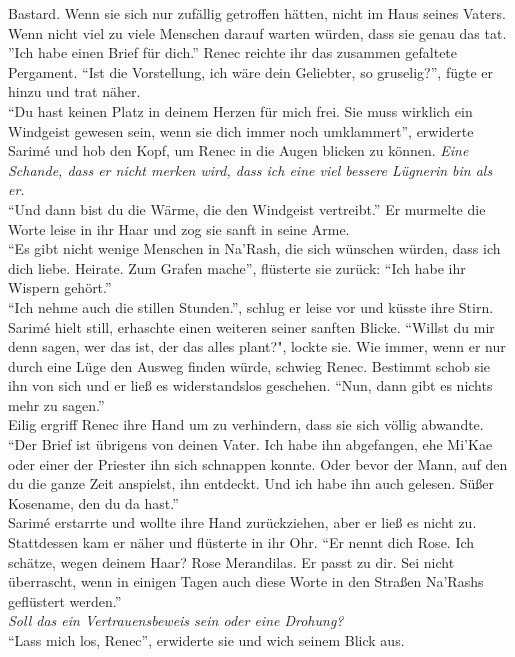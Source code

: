 Bastard. Wenn sie sich nur zufällig getroffen hätten, nicht im Haus seines Vaters. Wenn nicht viel 
zu viele Menschen darauf warten würden, dass sie genau das tat.\\
''Ich habe einen Brief für dich.'' Renec reichte ihr das zusammen gefaltete Pergament. ``Ist die 
Vorstellung, ich wäre dein Geliebter, so gruselig?'', fügte er hinzu und trat näher.\\
``Du hast keinen Platz in deinem Herzen für mich frei. Sie muss wirklich ein Windgeist gewesen 
sein, wenn sie dich immer noch umklammert'', erwiderte Sarimé und hob den Kopf, um Renec in die 
Augen blicken zu können. \textit{Eine Schande, dass er nicht merken wird, dass ich eine viel 
bessere Lügnerin bin als er.}\\
``Und dann bist du die Wärme, die den Windgeist vertreibt.'' Er murmelte die Worte leise in ihr 
Haar und zog sie sanft in seine Arme.\\
``Es gibt nicht wenige Menschen in Na'Rash, die sich wünschen würden, dass ich dich liebe. Heirate. 
Zum Grafen mache'', flüsterte sie zurück: ``Ich habe ihr Wispern gehört.''\\
``Ich nehme auch die stillen Stunden.'', schlug er leise vor und küsste ihre Stirn.\\
Sarimé hielt still, erhaschte einen weiteren seiner sanften Blicke. ``Willst du mir denn sagen, 
wer das ist, der das alles plant?", lockte sie.
Wie immer, wenn er nur durch eine Lüge den Ausweg finden würde, schwieg Renec. Bestimmt schob sie 
ihn von sich und er ließ es widerstandslos geschehen. ``Nun, dann gibt es nichts mehr zu sagen.''\\
Eilig ergriff Renec ihre Hand um zu verhindern, dass sie sich völlig abwandte. ``Der Brief ist 
übrigens von deinen Vater. Ich habe ihn abgefangen, ehe Mi'Kae oder einer der Priester ihn sich 
schnappen konnte. Oder bevor der Mann, auf den du die ganze Zeit anspielst, ihn entdeckt. Und ich 
habe ihn auch gelesen. Süßer Kosename, den du da hast.''\\
Sarimé erstarrte und wollte ihre Hand zurückziehen, aber er ließ es nicht zu. Stattdessen kam er 
näher und flüsterte in ihr Ohr. ``Er nennt dich Rose. Ich schätze, wegen deinem Haar? Rose 
Merandilas. Er passt zu dir. Sei nicht überrascht, wenn in einigen Tagen auch diese Worte in den 
Straßen Na'Rashs geflüstert werden.''\\
\textit{Soll das ein Vertrauensbeweis sein oder eine Drohung?}\\
``Lass mich los, Renec'', erwiderte sie und wich seinem Blick aus.\\
